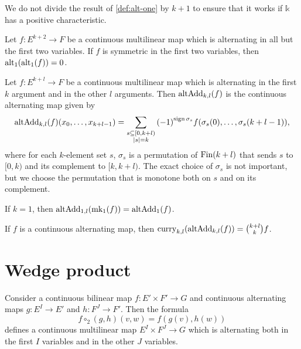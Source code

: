 \begin{remark}
  We do not divide the result of \autoref{def:alt-one} by \(k + 1\)
  to ensure that it works if \(\mathbb k\) has a positive characteristic.
\end{remark}

\begin{theorem}%
  \label{thm:uncurry2-eq-zero}
  Let \(f\colon E^{k + 2}\to F\) be a continuous multilinear map which is alternating in all but the first two variables.
  If \(f\) is symmetric in the first two variables, then \(\operatorname{alt_1}(\operatorname{alt_1}(f)) = 0\).
\end{theorem}


\begin{definition}%
  \label{def:uncurry-fin-add}
  Let \(f\colon E^{k + l}\to F\) be a continuous multilinear map
  which is alternating in the first \(k\) argument and in the other \(l\) arguments.
  Then \(\operatorname{altAdd}_{k,l}(f)\) is the continuous alternating map given by
  \[
    \operatorname{altAdd}_{k,l}(f)(x_{0}, \dots, x_{k + l - 1})=\sum_{\substack{s\subseteq [0, k + l)\\|s|=k}}{(-1)}^{\operatorname{sign} \sigma_{s}}f(\sigma_{s}(0), \dots, \sigma_{s}(k + l - 1)),
  \]
  where for each \(k\)-element set \(s\),
  \(\sigma_{s}\) is a permutation of \(\operatorname{Fin} (k + l)\) that sends \(s\) to \([0, k)\) and its complement to \([k, k + l)\).
  The exact choice of \(\sigma_{s}\) is not important, but we choose the permutation that is monotone both on \(s\) and on its complement.
\end{definition}

\begin{theorem}%
  \label{thm:uncurry-fin-add-one}
  If \(k = 1\), then \(\operatorname{altAdd}_{1, l}(\operatorname{mk_1}(f)) = \operatorname{altAdd}_{1}(f)\).
\end{theorem}

\begin{theorem}%
  \label{thm:curry-uncurry-fin-add}
  If \(f\) is a continuous alternating map, then \(\operatorname{curry}_{k, l}(\operatorname{altAdd}_{k, l}(f)) = \binom{k + l}{k}f\).
\end{theorem}

\section{Wedge product}%
\label{sec:wedge-product}

\begin{definition}
  Consider a continuous bilinear map \(f \colon E' \times F' \to G\)
  and continuous alternating maps \(g\colon E^{I}\to E'\) and \(h\colon F^{J}\to F'\).
  Then the formula
  \[
    f \circ_{2} (g, h)(v, w) = f(g(v), h(w))
  \]
  defines a continuous multilinear map \(E^{I}\times F^{J}\to G\)
  which is alternating both in the first \(I\) variables and in the other \(J\) variables.
\end{definition}

